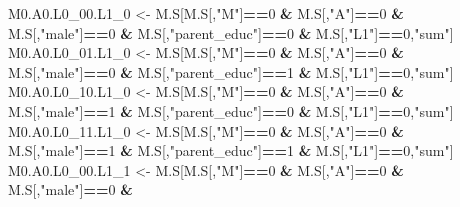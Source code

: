 \documentclass[
]{book}
\newenvironment{Shaded}{\begin{snugshade}}{\end{snugshade}}
\newcommand{\DecValTok}[1]{\textcolor[rgb]{0.00,0.00,0.81}{#1}}
\newcommand{\NormalTok}[1]{#1}
\newcommand{\OtherTok}[1]{\textcolor[rgb]{0.56,0.35,0.01}{#1}}
\newcommand{\SpecialCharTok}[1]{\textcolor[rgb]{0.81,0.36,0.00}{\textbf{#1}}}
\newcommand{\StringTok}[1]{\textcolor[rgb]{0.31,0.60,0.02}{#1}}
\begin{document}
\begin{Shaded}
\begin{Highlighting}[]
\NormalTok{  M0.A0.L0\_00.L1\_0 }\OtherTok{\textless{}{-}}\NormalTok{ M.S[M.S[,}\StringTok{"M"}\NormalTok{]}\SpecialCharTok{==}\DecValTok{0} \SpecialCharTok{\&}\NormalTok{ M.S[,}\StringTok{"A"}\NormalTok{]}\SpecialCharTok{==}\DecValTok{0} \SpecialCharTok{\&}\NormalTok{ M.S[,}\StringTok{"male"}\NormalTok{]}\SpecialCharTok{==}\DecValTok{0} \SpecialCharTok{\&} 
\NormalTok{                            M.S[,}\StringTok{"parent\_educ"}\NormalTok{]}\SpecialCharTok{==}\DecValTok{0} \SpecialCharTok{\&}\NormalTok{ M.S[,}\StringTok{"L1"}\NormalTok{]}\SpecialCharTok{==}\DecValTok{0}\NormalTok{,}\StringTok{"sum"}\NormalTok{]}
\NormalTok{  M0.A0.L0\_01.L1\_0 }\OtherTok{\textless{}{-}}\NormalTok{ M.S[M.S[,}\StringTok{"M"}\NormalTok{]}\SpecialCharTok{==}\DecValTok{0} \SpecialCharTok{\&}\NormalTok{ M.S[,}\StringTok{"A"}\NormalTok{]}\SpecialCharTok{==}\DecValTok{0} \SpecialCharTok{\&}\NormalTok{ M.S[,}\StringTok{"male"}\NormalTok{]}\SpecialCharTok{==}\DecValTok{0} \SpecialCharTok{\&} 
\NormalTok{                            M.S[,}\StringTok{"parent\_educ"}\NormalTok{]}\SpecialCharTok{==}\DecValTok{1} \SpecialCharTok{\&}\NormalTok{ M.S[,}\StringTok{"L1"}\NormalTok{]}\SpecialCharTok{==}\DecValTok{0}\NormalTok{,}\StringTok{"sum"}\NormalTok{]}
\NormalTok{  M0.A0.L0\_10.L1\_0 }\OtherTok{\textless{}{-}}\NormalTok{ M.S[M.S[,}\StringTok{"M"}\NormalTok{]}\SpecialCharTok{==}\DecValTok{0} \SpecialCharTok{\&}\NormalTok{ M.S[,}\StringTok{"A"}\NormalTok{]}\SpecialCharTok{==}\DecValTok{0} \SpecialCharTok{\&}\NormalTok{ M.S[,}\StringTok{"male"}\NormalTok{]}\SpecialCharTok{==}\DecValTok{1} \SpecialCharTok{\&} 
\NormalTok{                            M.S[,}\StringTok{"parent\_educ"}\NormalTok{]}\SpecialCharTok{==}\DecValTok{0} \SpecialCharTok{\&}\NormalTok{ M.S[,}\StringTok{"L1"}\NormalTok{]}\SpecialCharTok{==}\DecValTok{0}\NormalTok{,}\StringTok{"sum"}\NormalTok{]}
\NormalTok{  M0.A0.L0\_11.L1\_0 }\OtherTok{\textless{}{-}}\NormalTok{ M.S[M.S[,}\StringTok{"M"}\NormalTok{]}\SpecialCharTok{==}\DecValTok{0} \SpecialCharTok{\&}\NormalTok{ M.S[,}\StringTok{"A"}\NormalTok{]}\SpecialCharTok{==}\DecValTok{0} \SpecialCharTok{\&}\NormalTok{ M.S[,}\StringTok{"male"}\NormalTok{]}\SpecialCharTok{==}\DecValTok{1} \SpecialCharTok{\&} 
\NormalTok{                            M.S[,}\StringTok{"parent\_educ"}\NormalTok{]}\SpecialCharTok{==}\DecValTok{1} \SpecialCharTok{\&}\NormalTok{ M.S[,}\StringTok{"L1"}\NormalTok{]}\SpecialCharTok{==}\DecValTok{0}\NormalTok{,}\StringTok{"sum"}\NormalTok{]}
\NormalTok{  M0.A0.L0\_00.L1\_1 }\OtherTok{\textless{}{-}}\NormalTok{ M.S[M.S[,}\StringTok{"M"}\NormalTok{]}\SpecialCharTok{==}\DecValTok{0} \SpecialCharTok{\&}\NormalTok{ M.S[,}\StringTok{"A"}\NormalTok{]}\SpecialCharTok{==}\DecValTok{0} \SpecialCharTok{\&}\NormalTok{ M.S[,}\StringTok{"male"}\NormalTok{]}\SpecialCharTok{==}\DecValTok{0} \SpecialCharTok{\&} 

\end{Highlighting}
\end{Shaded}
\end{document}
